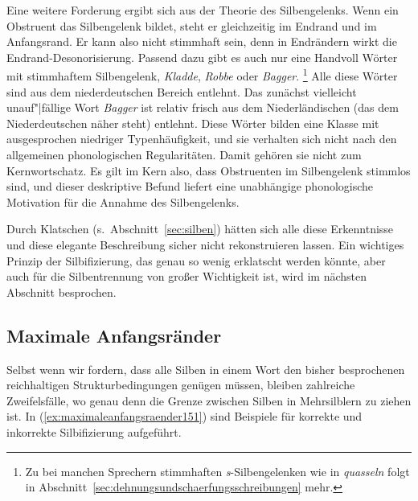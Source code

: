\begin{exe}
  \ex \label{ex:einsilblerundzweisilbler148}
  \begin{xlist}
    \ex[*]{[mɛːnʃ]}
    \ex[*]{[raːmʃ]}
    \ex[*]{[miːlç]}
    \ex[*]{[faːlʃ]}
  \end{xlist}
\end{exe}

\label{abs:einsilblerundzweisilbler149}
Eine weitere Forderung ergibt sich aus der Theorie des Silbengelenks.
Wenn ein Obstruent das Silbengelenk bildet, steht er gleichzeitig im Endrand und im Anfangsrand.
Er kann also nicht stimmhaft sein, denn in Endrändern wirkt die Endrand-Desonorisierung.
\label{abs:einsilblerundzweisilbler150}Passend dazu gibt es auch nur eine Handvoll Wörter mit stimmhaftem Silbengelenk, \zB \textit{Kladde}, \textit{Robbe} oder \textit{Bagger}.%
\footnote{Zu bei manchen Sprechern stimmhaften \textit{s}-Silbengelenken wie in \textit{quasseln} folgt in Abschnitt~\ref{sec:dehnungsundschaerfungsschreibungen} mehr.}
Alle diese Wörter sind aus dem niederdeutschen Bereich entlehnt.
Das zunächst vielleicht unauf"|fällige Wort \textit{Bagger} ist relativ frisch aus dem Niederländischen (das dem Niederdeutschen näher steht) entlehnt.
Diese Wörter bilden eine Klasse mit ausgesprochen niedriger Typenhäufigkeit, und sie verhalten sich nicht nach den allgemeinen phonologischen Regularitäten.
Damit gehören sie nicht zum Kernwortschatz.
Es gilt im Kern also, dass Obstruenten im Silbengelenk stimmlos sind, und dieser deskriptive Befund liefert eine unabhängige phonologische Motivation für die Annahme des Silbengelenks.

Durch Klatschen (s.\ Abschnitt~\ref{sec:silben}) hätten sich alle diese Erkenntnisse und diese elegante Beschreibung sicher nicht rekonstruieren lassen.
Ein wichtiges Prinzip der Silbifizierung, das genau so wenig erklatscht werden könnte, aber auch für die Silbentrennung von großer Wichtigkeit ist, wird im nächsten Abschnitt besprochen.

\subsection{Maximale Anfangsränder}
\label{sec:maximaleanfangsraender}


Selbst wenn wir fordern, dass alle Silben in einem Wort den bisher besprochenen reichhaltigen Strukturbedingungen genügen müssen, bleiben zahlreiche Zweifelsfälle, wo genau denn die Grenze zwischen Silben in Mehrsilblern zu ziehen ist.
In (\ref{ex:maximaleanfangsraender151}) sind Beispiele für korrekte und inkorrekte Silbifizierung aufgeführt.

